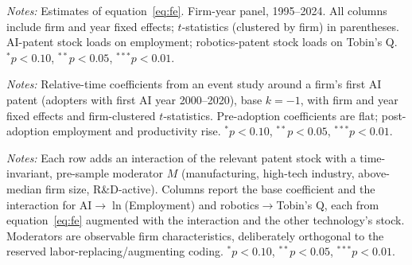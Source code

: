 \documentclass[12pt]{article}
\begin{document}
\begin{table}[htbp]\centering
\begin{threeparttable}
\caption{Cognitive vs.\ physical automation and firm outcomes (two-way FE)}\label{tab:fe}\small

\begin{tablenotes}\small\item \textit{Notes:} Estimates of equation~\eqref{eq:fe}. Firm-year
panel, 1995--2024. All columns include firm and year fixed effects; $t$-statistics (clustered by
firm) in parentheses. AI-patent stock loads on employment; robotics-patent stock loads on Tobin's
Q. $^{*}p<0.10$, $^{**}p<0.05$, $^{***}p<0.01$.
\end{tablenotes}
\end{threeparttable}
\end{table}

\begin{table}[htbp]\centering
\begin{threeparttable}
\caption{Event study: firm outcomes around the first AI patent}\label{tab:eventstudy}\small

\begin{tablenotes}\small\item \textit{Notes:} Relative-time coefficients from an event study
around a firm's first AI patent (adopters with first AI year 2000--2020), base $k=-1$, with firm
and year fixed effects and firm-clustered $t$-statistics. Pre-adoption coefficients are flat;
post-adoption employment and productivity rise. $^{*}p<0.10$, $^{**}p<0.05$, $^{***}p<0.01$.
\end{tablenotes}
\end{threeparttable}
\end{table}

\begin{table}[htbp]\centering
\begin{threeparttable}
\caption{Heterogeneity of the headline elasticities by observable moderator}\label{tab:hetero}\small

\begin{tablenotes}\small\item \textit{Notes:} Each row adds an interaction of the relevant patent
stock with a time-invariant, pre-sample moderator $M$ (manufacturing, high-tech industry,
above-median firm size, R\&D-active). Columns report the base coefficient and the interaction for
AI$\to\ln$(Employment) and robotics$\to$Tobin's Q, each from equation~\eqref{eq:fe} augmented with
the interaction and the other technology's stock. Moderators are observable firm characteristics,
deliberately orthogonal to the reserved labor-replacing/augmenting coding. $^{*}p<0.10$,
$^{**}p<0.05$, $^{***}p<0.01$.
\end{tablenotes}
\end{threeparttable}
\end{table}
\end{document}
